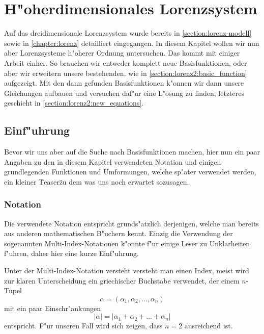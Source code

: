 %
%
%
\chapter{H"oherdimensionales Lorenzsystem\label{chapter:lorenz2}}
\begin{refsection}


Auf das dreidimensionale Lorenzsystem wurde bereits in 
\cref{section:lorenz-modell} sowie in \cref{chapter:lorenz} detailliert 
eingegangen. In diesem Kapitel wollen wir nun aber Lorenzsysteme h"oherer 
Ordnung untersuchen. Das kommt mit einiger Arbeit einher. So brauchen wir 
entweder komplett neue Basisfunktionen, oder aber wir erweitern unsere 
bestehenden, wie in \cref{section:lorenz2:basic_function} aufgezeigt. Mit den 
dann gefunden Basisfunktionen k"onnen wir dann unsere Gleichungen aufbauen und 
versuchen daf"ur eine L"osung zu finden, letzteres geschieht in 
\cref{section:lorenz2:new_equations}.

\section{Einf"uhrung}

Bevor wir uns aber auf die Suche nach Basisfunktionen machen, hier nun ein paar 
Angaben zu den in diesem Kapitel verwendeten Notation und einigen grundlegenden 
Funktionen und Umformungen, welche sp"ater verwendet werden, ein kleiner 
\"Teaser\" zu dem was uns noch erwartet sozusagen.

\subsection{Notation}
Die verwendete Notation entspricht grunds"atzlich derjenigen, welche man 
bereits aus anderen mathematischen B"uchern kennt. Einzig die Verwendung der 
sogenannten Multi-Index-Notationen k"onnte f"ur einige Leser zu Unklarheiten 
f"uhren, daher hier eine kurze Einf"uhrung.

Unter der Multi-Index-Notation versteht versteht man einen Index, meist wird 
zur klaren Unterscheidung ein griechischer Buchstabe verwendet, der einem 
$n$-Tupel
\begin{equation*}
	\alpha = (\alpha_1, \alpha_2, \dotsc, \alpha_n)
\end{equation*}
 mit ein paar Einschr"ankungen
\begin{equation*}
	|\alpha| = |\alpha_1 + \alpha_2 + \dots + \alpha_n|
\end{equation*}
 entspricht. F"ur unseren Fall wird sich zeigen, dass $n = 2$ ausreichend ist.
 

\end{refsection}
